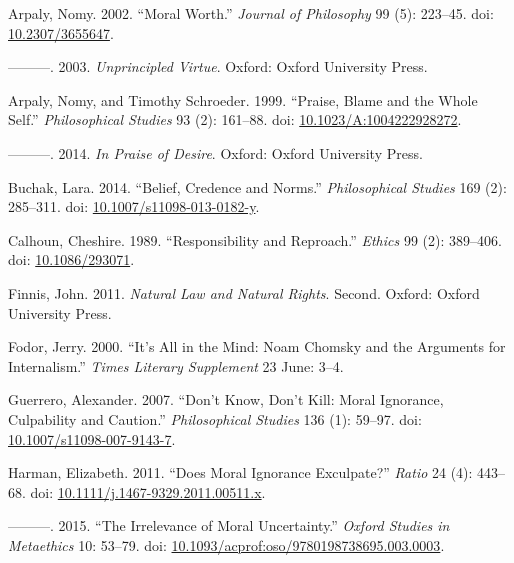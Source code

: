 \documentclass[
  10pt,
  letterpaper,
  DIV=11,
  numbers=noendperiod,
  twoside]{scrartcl}
\newlength{\cslhangindent}
\newenvironment{CSLReferences}[2] %
 {\begin{list}{}{%
  \setlength{\itemindent}{0pt}
  \setlength{\leftmargin}{0pt}
  \setlength{\parsep}{0pt}
  \ifodd #1
   \setlength{\leftmargin}{\cslhangindent}
   \setlength{\itemindent}{-1\cslhangindent}
  \fi
  \setlength{\itemsep}{#2\baselineskip}}}
 {\end{list}}
\begin{document}
\label{refs}
\begin{CSLReferences}{1}{0}
Arpaly, Nomy. 2002. {``Moral Worth.''} \emph{Journal of Philosophy} 99
(5): 223--45. doi:
\href{https://doi.org/10.2307/3655647}{10.2307/3655647}.

---------. 2003. \emph{Unprincipled Virtue}. Oxford: Oxford University
Press.

Arpaly, Nomy, and Timothy Schroeder. 1999. {``Praise, Blame and the
Whole Self.''} \emph{Philosophical Studies} 93 (2): 161--88. doi:
\href{https://doi.org/10.1023/A:1004222928272}{10.1023/A:1004222928272}.

---------. 2014. \emph{In Praise of Desire}. Oxford: Oxford University
Press.

Buchak, Lara. 2014. {``Belief, Credence and Norms.''}
\emph{Philosophical Studies} 169 (2): 285--311. doi:
\href{https://doi.org/10.1007/s11098-013-0182-y}{10.1007/s11098-013-0182-y}.

Calhoun, Cheshire. 1989. {``Responsibility and Reproach.''}
\emph{Ethics} 99 (2): 389--406. doi:
\href{https://doi.org/10.1086/293071}{10.1086/293071}.

Finnis, John. 2011. \emph{Natural Law and Natural Rights}. Second.
Oxford: Oxford University Press.

Fodor, Jerry. 2000. {``It's All in the Mind: Noam Chomsky and the
Arguments for Internalism.''} \emph{Times Literary Supplement} 23 June:
3--4.

Guerrero, Alexander. 2007. {``Don't Know, Don't Kill: Moral Ignorance,
Culpability and Caution.''} \emph{Philosophical Studies} 136 (1):
59--97. doi:
\href{https://doi.org/10.1007/s11098-007-9143-7}{10.1007/s11098-007-9143-7}.

Harman, Elizabeth. 2011. {``Does Moral Ignorance Exculpate?''}
\emph{Ratio} 24 (4): 443--68. doi:
\href{https://doi.org/10.1111/j.1467-9329.2011.00511.x}{10.1111/j.1467-9329.2011.00511.x}.

---------. 2015. {``The Irrelevance of Moral Uncertainty.''}
\emph{Oxford Studies in Metaethics} 10: 53--79. doi:
\href{https://doi.org/10.1093/acprof:oso/9780198738695.003.0003}{10.1093/acprof:oso/9780198738695.003.0003}.


\end{CSLReferences}
\end{document}
